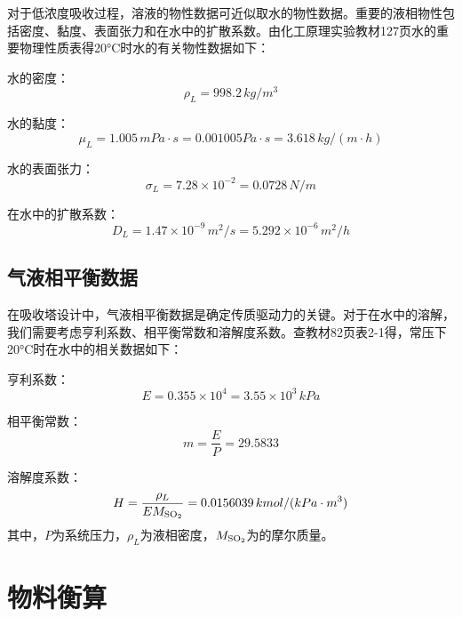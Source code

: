 对于低浓度吸收过程，溶液的物性数据可近似取水的物性数据。重要的液相物性包括密度、黏度、表面张力和在水中的扩散系数。由化工原理实验教材127页水的重要物理性质表得20°C时水的有关物性数据如下：

水的密度：
\begin{equation}
	\rho_{L} = 998.2 \, kg/m^3
\end{equation}

水的黏度：
\begin{equation}
	\mu_{L} = 1.005 \, mPa \cdot s = 0.001005 Pa \cdot s = 3.618 \, kg/(m \cdot h)
\end{equation}

水的表面张力：
\begin{equation}
	\sigma_{L} = 7.28 \times 10^{-2} = 0.0728\, N/m
\end{equation}

在水中的扩散系数：
\begin{equation}
	D_{L} = 1.47 \times 10^{-9} \, m^2/s = 5.292 \times 10^{-6} \, m^2/h
\end{equation}

\subsection{气液相平衡数据}

在吸收塔设计中，气液相平衡数据是确定传质驱动力的关键。对于在水中的溶解，我们需要考虑亨利系数、相平衡常数和溶解度系数。查教材82页表2-1得，常压下20°C时在水中的相关数据如下：

亨利系数：
\begin{equation}
	E = 0.355 \times 10^{4} = 3.55 \times 10^{3} \, kPa
\end{equation}

相平衡常数：
\begin{equation}
	m = \frac{E}{P} = 29.5833
\end{equation}

溶解度系数：
\begin{equation}
	H = \frac{\rho_{L}}{EM_{\ce{SO2}}} = 0.0156039 \, kmol/(kPa \cdot m^3)
\end{equation}
其中，$P$为系统压力，$\rho_{L}$为液相密度，$M_{\ce{SO2}}$为的摩尔质量。



\section{物料衡算}

